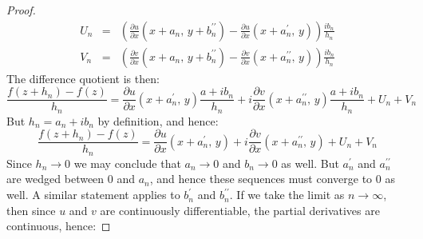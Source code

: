 \documentclass{article}
\theoremstyle{definition}
\begin{document}
\begin{proof}
\begin{equation}
\begin{array}{rcl}
                    U_{n}
                    &=&
                    \displaystyle
                    \left(
                        \frac{\partial{u}}{\partial{x}}
                        (x+a_{n},\,y+b_{n}^{\prime\prime})
                        -
                        \frac{\partial{u}}{\partial{x}}
                        (x+a_{n}^{\prime},\,y)
                    \right)
                    \frac{ib_{n}}{h_{n}}\\[2em]
                    V_{n}
                    &=&
                    \displaystyle
                    \left(
                        \frac{\partial{v}}{\partial{x}}
                        (x+a_{n},\,y+b_{n}^{\prime\prime})
                        -
                        \frac{\partial{v}}{\partial{x}}
                        (x+a_{n}^{\prime\prime},\,y)
                    \right)
                    \frac{ib_{n}}{h_{n}}
                \end{array}
            \end{equation}
            The difference quotient is then:
            \begin{equation}
                \frac{f(z+h_{n})-f(z)}{h_{n}}
                =\frac{\partial{u}}{\partial{x}}
                    (x+a_{n}^{\prime},\,y)
                    \frac{a+ib_{n}}{h_{n}}
                +i\frac{\partial{v}}{\partial{x}}
                    (x+a_{n}^{\prime\prime},\,y)
                    \frac{a+ib_{n}}{h_{n}}
                +U_{n}+V_{n}
            \end{equation}
            But $h_{n}=a_{n}+ib_{n}$ by definition, and hence:
            \begin{equation}
                \frac{f(z+h_{n})-f(z)}{h_{n}}
                =\frac{\partial{u}}{\partial{x}}
                    (x+a_{n}^{\prime},\,y)
                +i\frac{\partial{v}}{\partial{x}}
                    (x+a_{n}^{\prime\prime},\,y)
                +U_{n}+V_{n}
            \end{equation}
            Since $h_{n}\rightarrow{0}$ we may conclude that
            $a_{n}\rightarrow{0}$ and $b_{n}\rightarrow{0}$ as well.
            But $a_{n}^{\prime}$ and $a_{n}^{\prime\prime}$ are wedged between
            $0$ and $a_{n}$, and hence these sequences must converge to $0$
            as well. A similar statement applies to $b_{n}^{\prime}$ and
            $b_{n}^{\prime\prime}$.
            If we take the limit as $n\rightarrow\infty$, then since
            $u$ and $v$ are continuously differentiable, the partial
            derivatives are continuous, hence:

\end{proof}
\end{document}
